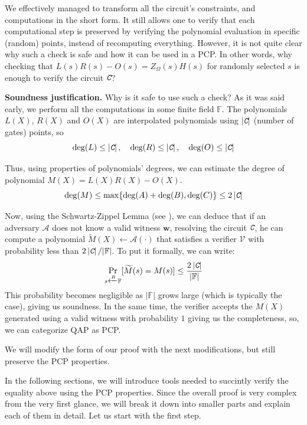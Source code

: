 \documentclass[../lecture-notes.tex]{subfiles}
\begin{document}
We effectively managed to transform all the circuit's constraints, and computations in the short form.
It still allows one to verify that each computational step is preserved by verifying the 
polynomial evaluation in specific (random) points, instead of recomputing everything. However, it is 
not quite clear why such a check is safe and how it can be used in a PCP. In other words, why checking that $L(s)R(s)-O(s)=Z_{\Omega}(s)H(s)$ for randomly selected $s$ is enough to verify the circuit $\textit{\texttt{C}}$?

\textbf{Soundness justification.} Why is it safe to use such a check? As it was said early, 
we perform all the computations in some finite field $\mathbb{F}$. The 
polynomials $L(X)$, $R(X)$ and $O(X)$ are interpolated polynomials using $\left| \textit{\texttt{C}} \right|$ (number of gates) points, so 
\begin{equation*}
    \deg(L) \le \left| \textit{\texttt{C}} \right|, \quad 
    \deg(R) \le \left| \textit{\texttt{C}} \right|, \quad 
    \deg(O) \le \left| \textit{\texttt{C}} \right|
\end{equation*}

Thus, using properties of polynomials' degrees, we can estimate the degree of polynomial $M(X) = L(X)R(X) - O(X)$.
\begin{equation*}
    \deg(M) \leq \max\{\deg(A) + \deg(B), \deg(C)\} \leq 2 \left| \textit{\texttt{C}} \right|
\end{equation*}

Now, using the Schwartz-Zippel Lemma (see ),
we can deduce that if an adversary $\mathcal{A}$ does not know a valid witness $\mathbf{w}$, 
resolving the circuit $\textit{\texttt{C}}$, he can compute a polynomial $\widetilde{M}(X) \gets \mathcal{A}(\cdot)$ that 
satisfies a verifier $\mathcal{V}$ with probability less than $2 \left| \textit{\texttt{C}} \right|/|\mathbb{F}|$. To put it formally, we can write:
\begin{equation*}
    \mathop{\text{Pr}}_{s \xleftarrow{R} \mathbb{F}}[\widetilde{M}(s) = M(s)] \leq \frac{2 \left| \textit{\texttt{C}} \right|}{|\mathbb{F}|}
\end{equation*}
This probability becomes negligible as $|\mathbb{F}|$ grows large (which is typically the case), giving us soundness. In the same time, the
verifier accepts the $M(X)$ generated using a valid witness with probability $1$ giving us the 
completeness, so, we can categorize QAP as PCP. 

We will modify the form of our proof with the next modifications, but still preserve the PCP 
properties.

In the following sections, we will introduce tools needed to succintly verify the equality above
using the PCP properties. Since the overall proof is very complex from the very first glance, 
we will break it down into smaller parts and explain each of them in detail. Let us start 
with the first step.
\end{document}
